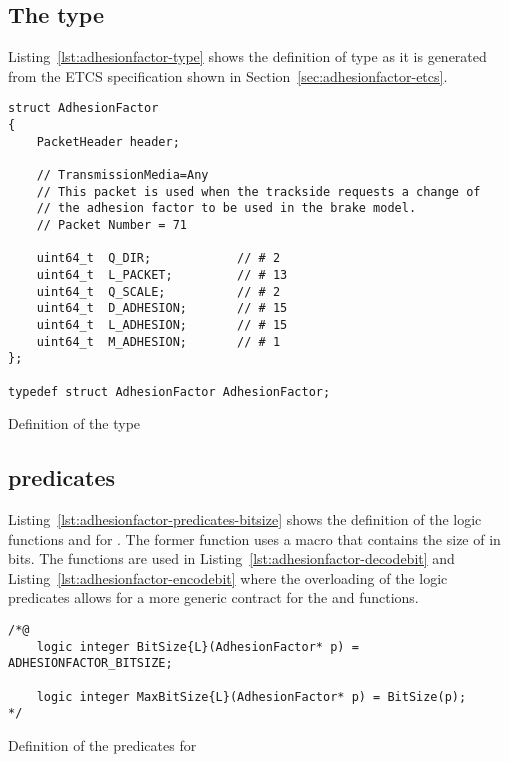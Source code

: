 \subsection{The type }
\label{sec:adhesionfactor-type}

Listing~\ref{lst:adhesionfactor-type} shows the definition of type
 as it is generated from the ETCS specification shown in Section~\ref{sec:adhesionfactor-etcs}.

\begin{listing}[hbt]
\begin{minipage}{0.99\textwidth}
\begin{lstlisting}[style=acsl-block]
struct AdhesionFactor
{
    PacketHeader header;

    // TransmissionMedia=Any
    // This packet is used when the trackside requests a change of
    // the adhesion factor to be used in the brake model.
    // Packet Number = 71

    uint64_t  Q_DIR;            // # 2
    uint64_t  L_PACKET;         // # 13
    uint64_t  Q_SCALE;          // # 2
    uint64_t  D_ADHESION;       // # 15
    uint64_t  L_ADHESION;       // # 15
    uint64_t  M_ADHESION;       // # 1
};

typedef struct AdhesionFactor AdhesionFactor;
\end{lstlisting}
\end{minipage}
\caption{\label{lst:adhesionfactor-type}Definition of the type }
\end{listing}

\FloatBarrier  %

\subsection{\acsl predicates }
\label{sec:adhesionfactor-predicates-bitsize}

Listing~\ref{lst:adhesionfactor-predicates-bitsize} shows the definition of
the logic functions  and  for .
The former function uses a macro that contains the size of  in bits.
The functions are used in Listing~\ref{lst:adhesionfactor-decodebit} and
Listing~\ref{lst:adhesionfactor-encodebit} where the overloading of the
logic predicates allows for a more generic \acsl contract for the  and
 functions.

\begin{listing}[hbt]
\begin{minipage}{0.99\textwidth}
\begin{lstlisting}[style=acsl-block]
/*@
    logic integer BitSize{L}(AdhesionFactor* p) = ADHESIONFACTOR_BITSIZE;

    logic integer MaxBitSize{L}(AdhesionFactor* p) = BitSize(p);
*/
\end{lstlisting}
\end{minipage}
\caption{\label{lst:adhesionfactor-predicates-bitsize}Definition of the  predicates for }
\end{listing}

